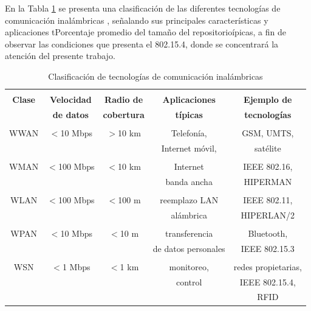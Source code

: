 


En la Tabla \ref{tabla_inalambricas} se presenta una clasificación de las diferentes tecnologías de comunicación inalámbricas \cite{Kuo07}, señalando sus principales características  y aplicaciones tPorcentaje promedio del tamaño del repositorioípicas, a fin de observar las condiciones que presenta el 802.15.4, donde se concentrará la atención del presente trabajo.

\begin{spacing}{1.0}
\begin{table}[H]
\centering
\caption{Clasificación de tecnologías de comunicación inalámbricas} 
\begin{tabular}{|c|c|c|c|c|}
\hline 
\rowcolor{gray!30} &&&&\\
\rowcolor{gray!30} \textbf{Clase} & \textbf{Velocidad} & \textbf{Radio de} & \textbf{Aplicaciones} & \textbf{Ejemplo de}\\ 
\rowcolor{gray!30} & \textbf{de datos} & \textbf{cobertura} & \textbf{típicas} & \textbf{tecnologías}\\[0.3cm]
\hline 
&&&&\\[-0.2cm]
WWAN & $<$10 Mbps & $>$10 km & Telefonía, & GSM, UMTS,\\
 & & & Internet móvil, & satélite\\[0.2cm]
\hline 
&&&&\\[-0.2cm]
WMAN & $<$100 Mbps & $<$10 km & Internet & IEEE 802.16,\\
 & & & banda ancha & HIPERMAN\\[0.2cm] 
\hline
&&&&\\[-0.2cm]
WLAN & $<$100 Mbps & $<$100 m & reemplazo LAN & IEEE 802.11,\\
 & & & alámbrica & HIPERLAN/2\\[0.2cm] 
\hline
&&&&\\[-0.2cm]
WPAN & $<$10 Mbps & $<$10 m & transferencia & Bluetooth,\\
 & & & de datos personales & IEEE 802.15.3\\[0.2cm]  
\hline
&&&&\\[-0.2cm]
WSN & $<$1 Mbps & $<$1 km & monitoreo, & redes propietarias,\\
 & & & control & IEEE 802.15.4,\\ 
 & & & & RFID\\[0.2cm] 
\hline
\end{tabular}
\label{tabla_inalambricas}
\end{table}
\end{spacing}

